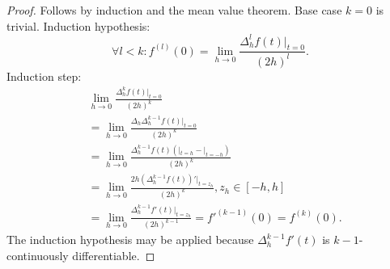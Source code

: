 \documentclass[a4paper,12pt]{article}
\begin{document}
\begin{proof}
    Follows by induction and the mean value theorem. Base case $k=0$ is trivial.
    Induction hypothesis:
    \begin{equation}
        \forall l<k: f^{(l)}(0) = \lim_{h \to 0} \frac{\Delta^{l}_{h} f(t)|_{t=0}}{(2h)^{l}}
        .
    \end{equation}
    Induction step:
    \begin{align}
         & \lim_{h \to 0} \frac{\Delta^{k}_{h} f(t)|_{t=0}}{(2h)^{k}}                                         \\
         & = \lim_{h \to 0} \frac{\Delta_{h}\Delta^{k-1}_{h} f(t)|_{t=0}}{(2h)^{k}}                           \\
         & = \lim_{h \to 0} \frac{\Delta^{k-1}_{h} f(t)(|_{t=h}-|_{t=-h})}{(2h)^{k}}                          \\
         & = \lim_{h \to 0} \frac{2h (\Delta^{k-1}_{h} f(t))'|_{t=z_{h}}}{(2h)^{k}}, z_{h} \in[-h,h]          \\
         & = \lim_{h \to 0} \frac{\Delta^{k-1}_{h} f'(t)|_{t=z_{h}}}{(2h)^{k-1}} = f'^{(k-1)}(0) = f^{(k)}(0)
        .
    \end{align}
    The induction hypothesis may be applied because $\Delta^{k-1}_{h} f'(t)$ is $k-1$-continuously differentiable.

\end{proof}
\end{document}
